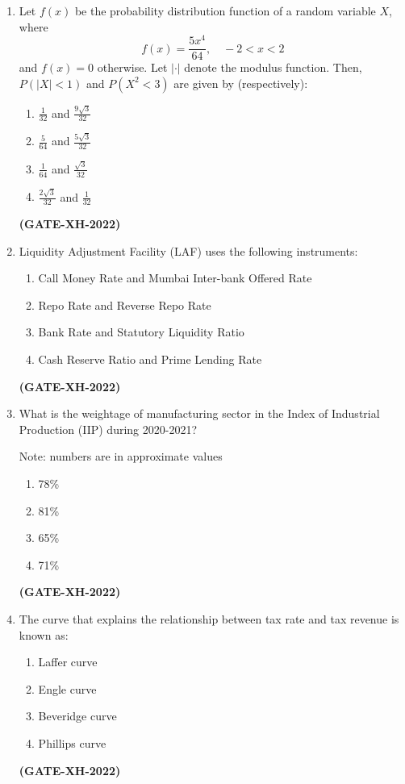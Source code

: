 \documentclass[journal]{IEEEtran}
\begin{document}
\begin{enumerate}
\item Let $f(x)$ be the probability distribution function of a random variable $X$, where
\[
f(x) = \frac{5x^4}{64}, \quad -2 < x < 2
\]
and $f(x) = 0$ otherwise. Let $|\cdot|$ denote the modulus function. Then, $P(|X| < 1)$ and $P(X^2 < 3)$ are given by (respectively):
\begin{multicols}{4}
\begin{enumerate}
\item $\frac{1}{32}$ and $\frac{9\sqrt{3}}{32}$
\item $\frac{5}{64}$ and $\frac{5\sqrt{3}}{32}$
\item $\frac{1}{64}$ and $\frac{\sqrt{3}}{32}$
\item $\frac{2\sqrt{3}}{32}$ and $\frac{1}{32}$
\end{enumerate}
\end{multicols}
\hfill\textbf{(GATE-XH-2022)}

\item Liquidity Adjustment Facility (LAF) uses the following instruments:
\begin{enumerate}
\item Call Money Rate and Mumbai Inter-bank Offered Rate
\item Repo Rate and Reverse Repo Rate
\item Bank Rate and Statutory Liquidity Ratio
\item Cash Reserve Ratio and Prime Lending Rate
\end{enumerate}
\hfill\textbf{(GATE-XH-2022)}
\item What is the weightage of manufacturing sector in the Index of Industrial Production (IIP) during 2020-2021?  

Note: numbers are in approximate values  
\begin{multicols}{2}
\begin{enumerate}
\item 78\%
\item 81\%
\item 65\%
\item 71\%
\end{enumerate}
\end{multicols}
\hfill\textbf{(GATE-XH-2022)}

\item The curve that explains the relationship between tax rate and tax revenue is known as:
\begin{multicols}{2}
\begin{enumerate}
\item Laffer curve
\item Engle curve
\item Beveridge curve
\item Phillips curve
\end{enumerate}
\end{multicols}
\hfill\textbf{(GATE-XH-2022)}


\end{enumerate}
\end{document}
